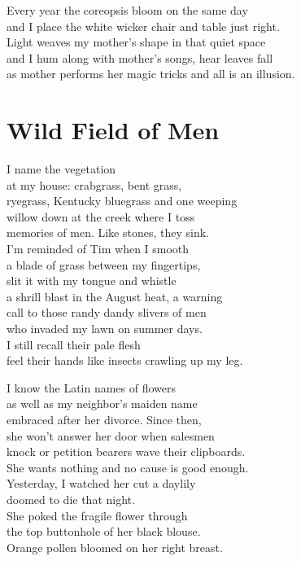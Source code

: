 \documentclass[twoside,10pt]{book}
\begin{document}
Every year the coreopsis bloom on the same day\\
and I place the white wicker chair and table just right.\\
Light weaves my mother's shape in that quiet space\\
and I hum along with mother's songs, hear leaves fall\\
as mother performs her magic tricks and all is an illusion.


\clearpage
\section{Wild Field of Men}

I name the vegetation\\
at my house: crabgrass, bent grass,\\
ryegrass, Kentucky bluegrass and one weeping\\
willow down at the creek where I toss\\
memories of men. Like stones, they sink.\\
I'm reminded of Tim when I smooth\\
a blade of grass between my fingertips,\\
slit it with my tongue and whistle\\
a shrill blast in the August heat, a warning\\
call to those randy dandy slivers of men\\
who invaded my lawn on summer days.\\
I still recall their pale flesh\\
feel their hands like insects crawling up my leg.

I know the Latin names of flowers\\
as well as my neighbor's maiden name\\
embraced after her divorce. Since then,\\
she won't answer her door when salesmen\\
knock or petition bearers wave their clipboards.\\
She wants nothing and no cause is good enough.\\
Yesterday, I watched her cut a daylily\\
doomed to die that night.\\
She poked the fragile flower through\\
the top buttonhole of her black blouse.\\
Orange pollen bloomed on her right breast.
\end{document}
